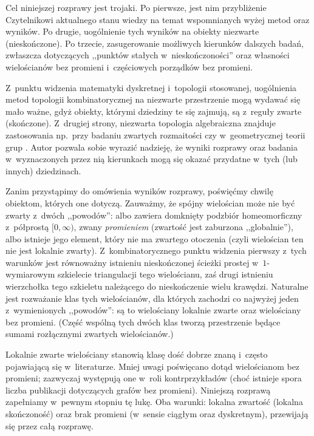 Cel niniejszej rozprawy jest trojaki. Po pierwsze, jest nim przybliżenie Czytelnikowi aktualnego stanu wiedzy na temat wspomnianych wyżej metod oraz wyników. Po drugie, uogólnienie tych wyników na obiekty niezwarte (nieskończone). Po trzecie, zasugerowanie możliwych kierunków dalszych badań, zwłaszcza dotyczących ,,punktów stałych w~nieskończoności'' oraz własności wielościanów bez promieni i~częściowych porządków bez promieni.

Z~punktu widzenia matematyki dyskretnej i~topologii stosowanej, uogólnienia metod topologii kombinatorycznej na niezwarte przestrzenie mogą wydawać się mało ważne, gdyż obiekty, którymi dziedziny te się zajmują, są z~reguły zwarte (skończone). Z~drugiej strony, niezwarta topologia algebraiczna znajduje zastosowania np.~przy badaniu zwartych rozmaitości czy w~geometrycznej teorii grup \cite{Guilbault13,Geoghegan08,Hughes96}. Autor pozwala sobie wyrazić nadzieję, że wyniki rozprawy oraz badania w~wyznaczonych przez nią kierunkach mogą się okazać przydatne w~tych (lub innych) dziedzinach.

Zanim przystąpimy do omówienia wyników rozprawy, poświęćmy chwilę obiektom, których one dotyczą. Zauważmy, że spójny wielościan może nie być zwarty z~dwóch ,,powodów'': albo zawiera domknięty podzbiór homeomorficzny z~półprostą $[0,\infty)$, zwany \textit{promieniem} (zwartość jest zaburzona ,,globalnie''), albo istnieje jego element, który nie ma zwartego otoczenia (czyli wielościan ten nie jest lokalnie zwarty). Z~kombinatorycznego punktu widzenia pierwszy z~tych warunków jest równoważny istnieniu nieskończonej ścieżki prostej w~\mbox{$1$-wymiarowym} szkielecie triangulacji tego wielościanu, zaś drugi istnieniu wierzchołka tego szkieletu należącego do nieskończenie wielu krawędzi. Naturalne jest rozważanie klas tych wielościanów, dla których zachodzi co najwyżej jeden z~wymienionych ,,powodów'': są to wielościany lokalnie zwarte oraz wielościany bez promieni. (Część wspólną tych dwóch klas tworzą przestrzenie będące sumami rozłącznymi zwartych wielościanów.)

Lokalnie zwarte wielościany stanowią klasę dość dobrze znaną i~często pojawiającą się w~literaturze. Mniej uwagi poświęcano dotąd wielościanom bez promieni; zazwyczaj występują one w~roli kontrprzykładów (choć istnieje spora liczba publikacji dotyczących grafów bez promieni). Niniejszą rozprawą zapełniamy w~pewnym stopniu tę lukę. Oba warunki: lokalna zwartość (lokalna skończoność) oraz brak promieni (w~sensie ciągłym oraz dyskretnym), przewijają się przez całą rozprawę. 
 

